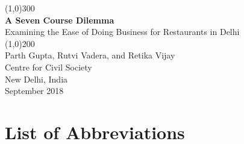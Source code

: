 \documentclass[a4paper, 12pt]{article}
\begin{document}
                    
                    
                    \begin{titlepage}
                    \begin{center}
                    	
			\line(1,0){300}\\
                    	[0.25in]
                    	\huge{\bfseries \textcolor{CCSbrown} {A Seven Course Dilemma}} \\
    			[0.5cm]
    			\large  {Examining the Ease of Doing Business for Restaurants in Delhi} \\%
    	
                    	\line(1,0){200}\\
                    	[4in]
                    	\LARGE {Parth Gupta, Rutvi Vadera, and Retika Vijay} \\ %
                    	[2cm]
                    	{\Large Centre for Civil Society} \\
                    	{\normalsize New Delhi, India} \\
			{\normalsize September 2018} \\
    			
      
                    \end{center}
                    \end{titlepage}
                    
                 
                    \tableofcontents
                    
                    
                   \newpage
                   
                   \section*{List of Abbreviations}
                  
\end{document}

